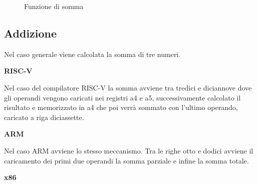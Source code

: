 \documentclass[12pt, a4paper]{report}
\begin{document}
\begin{figure}[ht]
 
 \begin{subfigure}{0.3\textwidth}
 
 


 \end{subfigure}
 \hfill
 \begin{subfigure}{0.3\textwidth}
 
 


 \end{subfigure}
 \hfill
 \begin{subfigure}{0.3\textwidth}
 
 


 \end{subfigure}
 
 \caption{Funzione di somma}
 
\end{figure}

\subsection{Addizione}
Nel caso generale viene calcolata la somma di tre numeri.



\vspace{0.3 cm}
\textbf{RISC-V}

Nel caso del compilatore RISC-V la somma avviene tra tredici e diciannove dove gli operandi vengono caricati nei registri a4 e a5, successivamente calcolato il risultato e memorizzato in a4 che poi verrà sommato con l'ultimo operando, caricato a riga diciassette.

\vspace{0.3 cm}
\textbf{ARM}

Nel caso ARM avviene lo stesso meccanismo. Tra le righe otto e dodici avviene il caricamento dei primi due operandi la somma parziale e infine la somma totale.

\vspace{0.3 cm}
\textbf{x86}
\end{document}
